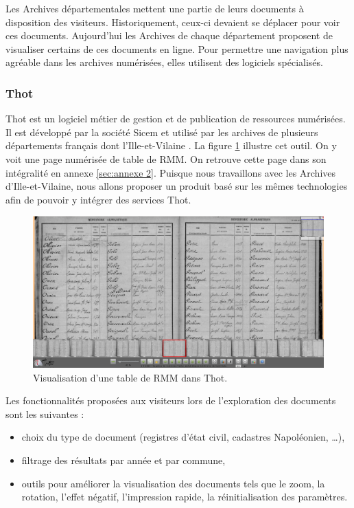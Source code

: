 \documentclass[a4paper]{article}
\begin{document}
	Les Archives d\'epartementales mettent une partie de leurs documents \`a disposition des visiteurs. Historiquement, ceux-ci devaient se d\'eplacer pour voir ces documents. Aujourd'hui les Archives de chaque d\'epartement proposent de visualiser certains de ces documents en ligne. Pour permettre une navigation plus agr\'eable dans les archives num\'eris\'ees, elles utilisent des logiciels sp\'ecialis\'es.

\subsubsection{Thot}

	Thot est un logiciel m\'etier de gestion et de publication de ressources num\'eris\'ees. Il est d\'evelopp\'e par la soci\'et\'e Sicem et utilis\'e par les archives de plusieurs d\'epartements fran\c{c}ais dont l'Ille-et-Vilaine \cite{thot}. La figure \ref{fig:thot} illustre cet outil. On y voit une page num\'eris\'ee de table de RMM. On retrouve cette page dans son int\'egralit\'e en annexe \ref{sec:annexe 2}.
Puisque nous travaillons avec les Archives d'Ille-et-Vilaine, nous allons proposer un produit bas\'e sur les m\^emes technologies afin de pouvoir y int\'egrer des services Thot.

\begin{figure}[H]
\centering
\includegraphics[width=1.0\textwidth]{thot.png}
\caption{\label{fig:thot}Visualisation d'une table de RMM dans Thot.}
\end{figure}

	Les fonctionnalit\'es propos\'ees aux visiteurs lors de l'exploration des documents sont les suivantes :
\begin{itemize}
\item choix du type de document (registres d'\'etat civil, cadastres Napol\'eonien, \ldots),
\item filtrage des r\'esultats par ann\'ee et par commune,
\item outils pour am\'eliorer la visualisation des documents tels que le zoom, la rotation, l'effet n\'egatif, l'impression rapide, la r\'einitialisation des param\`etres.
\end{itemize}
	
\end{document}

